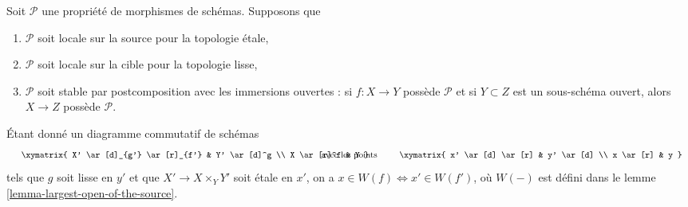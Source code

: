 \begin{lemma}
\label{lemma-etale-tau-local-source-target}
Soit $\mathcal{P}$ une propriété de morphismes de schémas. Supposons que
\begin{enumerate}
\item $\mathcal{P}$ soit locale sur la source pour la topologie \'etale,
\item $\mathcal{P}$ soit locale sur la cible pour la topologie lisse,
\item $\mathcal{P}$ soit stable par postcomposition avec les immersions
ouvertes : si $f : X \to Y$ possède $\mathcal{P}$ et si $Y \subset Z$ est un
sous-schéma ouvert, alors $X \to Z$ possède $\mathcal{P}$.
\end{enumerate}
Étant donné un diagramme commutatif de schémas
$$
\vcenter{
\xymatrix{
X' \ar[d]_{g'} \ar[r]_{f'} & Y' \ar[d]^g \\
X \ar[r]^f & Y
}
}
\quad\text{avec les points}\quad
\vcenter{
\xymatrix{
x' \ar[d] \ar[r] & y' \ar[d] \\
x \ar[r] & y
}
}
$$
tels que $g$ soit lisse en $y'$ et que $X' \to X \times_Y Y'$ soit \'etale
en $x'$, on a $x \in W(f) \Leftrightarrow x' \in W(f')$, où $W(-)$ est défini
dans le lemme \ref{lemma-largest-open-of-the-source}.
\end{lemma}

